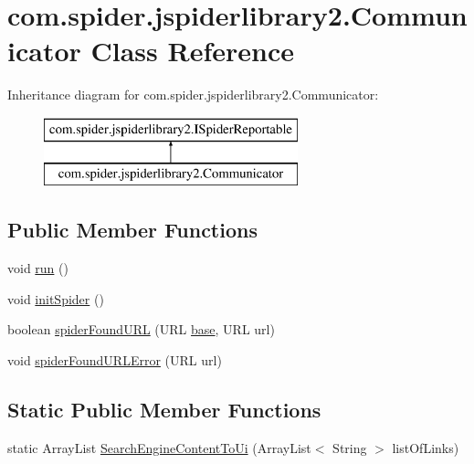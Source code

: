 \hypertarget{classcom_1_1spider_1_1jspiderlibrary2_1_1_communicator}{\section{com.\-spider.\-jspiderlibrary2.\-Communicator \-Class \-Reference}
\label{classcom_1_1spider_1_1jspiderlibrary2_1_1_communicator}
}
\-Inheritance diagram for com.\-spider.\-jspiderlibrary2.\-Communicator\-:\begin{figure}[H]
\begin{center}
\leavevmode
\includegraphics[height=2.000000cm]{classcom_1_1spider_1_1jspiderlibrary2_1_1_communicator}
\end{center}
\end{figure}
\subsection*{\-Public \-Member \-Functions}
\begin{DoxyCompactItemize}
\item 
void \hyperlink{classcom_1_1spider_1_1jspiderlibrary2_1_1_communicator_ab18b38c7ec6b8a8909267637649dd83a}{run} ()
\item 
void \hyperlink{classcom_1_1spider_1_1jspiderlibrary2_1_1_communicator_a41dd179b227fe3a5878f0b524d4ad1ad}{init\-Spider} ()
\item 
boolean \hyperlink{classcom_1_1spider_1_1jspiderlibrary2_1_1_communicator_a83fbf33e52836a135e944d0bde0cfd27}{spider\-Found\-U\-R\-L} (\-U\-R\-L \hyperlink{classcom_1_1spider_1_1jspiderlibrary2_1_1_communicator_ad0101fe504108054c599ff671b035ae7}{base}, \-U\-R\-L url)
\item 
void \hyperlink{classcom_1_1spider_1_1jspiderlibrary2_1_1_communicator_a18cc8b470895868f1d1fbf564c02e6f2}{spider\-Found\-U\-R\-L\-Error} (\-U\-R\-L url)
\end{DoxyCompactItemize}
\subsection*{\-Static \-Public \-Member \-Functions}
\begin{DoxyCompactItemize}
\item 
static \-Array\-List \hyperlink{classcom_1_1spider_1_1jspiderlibrary2_1_1_communicator_a4ff84ef1668376cdb43e76f0b376188c}{\-Search\-Engine\-Content\-To\-Ui} (\-Array\-List$<$ \-String $>$ list\-Of\-Links)
\end{DoxyCompactItemize}
